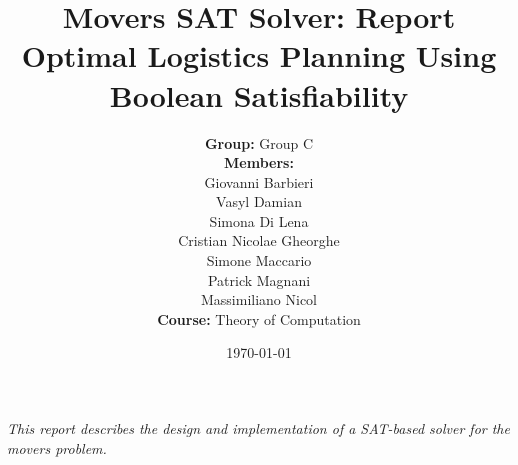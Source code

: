 \documentclass[11pt,a4paper]{article}
\title{
    \textbf{Movers SAT Solver: Report}\\
    \large Optimal Logistics Planning Using Boolean Satisfiability
}
\author{
    \textbf{Group:} Group C\\[0.5em]
    \textbf{Members:}\\
    Giovanni Barbieri\\
    Vasyl Damian\\
    Simona Di Lena\\
    Cristian Nicolae Gheorghe\\
    Simone Maccario\\
    Patrick Magnani\\
    Massimiliano Nicol\\[0.5em]
    \textbf{Course:} Theory of Computation
}
\date{\today}
\begin{document}
    \maketitle

    \begin{center}
        \vspace{1em}
        \textit{This report describes the design and implementation of a SAT-based solver for the movers problem.}
    \end{center}

    \newpage

    \tableofcontents

    \newpage

    
    \newpage

    
    \newpage

    
    \newpage

    
    \newpage

    
    \newpage

    
    \newpage

    
    \newpage

    
    \newpage

    
    \newpage

    
    \newpage

    
    \newpage

    
    \newpage

    
    \newpage

    \begin{appendices}

        
        \newpage

        
        \newpage

        
        \newpage

        
    \end{appendices}
\end{document}
